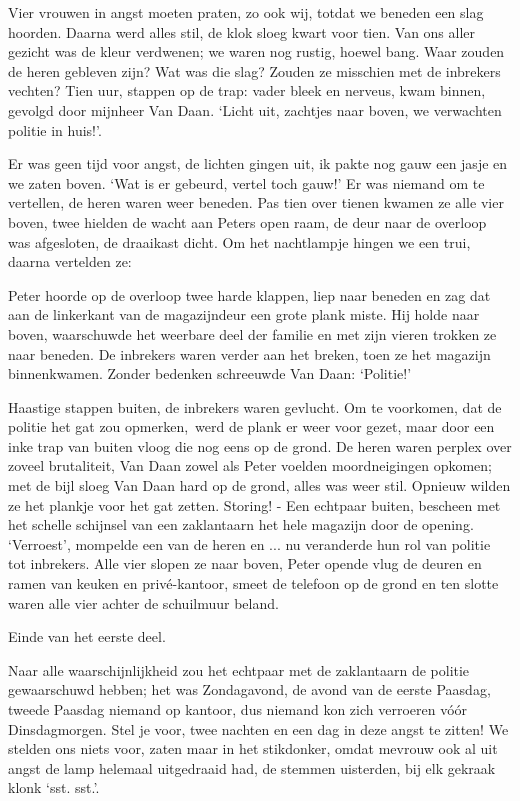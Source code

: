 \documentclass{book}
\begin{document}
Vier vrouwen in angst moeten praten, zo ook wij, totdat we beneden een
slag hoorden. Daarna werd alles stil, de klok sloeg kwart voor tien. Van
ons aller gezicht was de kleur verdwenen; we waren nog rustig, hoewel
bang. Waar zouden de heren gebleven zijn? Wat was die slag? Zouden ze
misschien met de inbrekers vechten? Tien uur, stappen op de trap: vader
bleek en nerveus, kwam binnen, gevolgd door mijnheer Van Daan. `Licht
uit, zachtjes naar boven, we verwachten politie in huis!'.

Er was geen tijd voor angst, de lichten gingen uit, ik pakte nog gauw
een jasje en we zaten boven. `Wat is er gebeurd, vertel toch gauw!' Er
was niemand om te vertellen, de heren waren weer beneden. Pas tien over
tienen kwamen ze alle vier boven, twee hielden de wacht aan Peters open
raam, de deur naar de overloop was afgesloten, de draaikast dicht. Om
het nachtlampje hingen we een trui, daarna vertelden ze:

Peter hoorde op de overloop twee harde klappen, liep naar beneden en zag
dat aan de linkerkant van de magazijndeur een grote plank miste. Hij
holde naar boven, waarschuwde het weerbare deel der familie en met zijn
vieren trokken ze naar beneden. De inbrekers waren verder aan het
breken, toen ze het magazijn binnenkwamen. Zonder bedenken schreeuwde
Van Daan: `Politie!'

Haastige stappen buiten, de inbrekers waren gevlucht. Om te voorkomen,
dat de politie het gat zou opmerken,~werd de plank er weer voor gezet,
maar door een inke trap van buiten vloog die nog eens op de grond. De
heren waren perplex over zoveel brutaliteit, Van Daan zowel als Peter
voelden moordneigingen opkomen; met de bijl sloeg Van Daan hard op de
grond, alles was weer stil. Opnieuw wilden ze het plankje voor het gat
zetten. Storing! - Een echtpaar buiten, bescheen met het schelle
schijnsel van een zaklantaarn het hele magazijn door de opening.
`Verroest', mompelde een van de heren en ... nu veranderde hun rol van
politie tot inbrekers. Alle vier slopen ze naar boven, Peter opende vlug
de deuren en ramen van keuken en privé-kantoor, smeet de telefoon op de
grond en ten slotte waren alle vier achter de schuilmuur beland.

Einde van het eerste deel.

Naar alle waarschijnlijkheid zou het echtpaar met de zaklantaarn de
politie gewaarschuwd hebben; het was Zondagavond, de avond van de eerste
Paasdag, tweede Paasdag niemand op kantoor, dus niemand kon zich
verroeren vóór Dinsdagmorgen. Stel je voor, twee nachten en een dag in
deze angst te zitten! We stelden ons niets voor, zaten maar in het
stikdonker, omdat mevrouw ook al uit angst de lamp helemaal uitgedraaid
had, de stemmen uisterden, bij elk gekraak klonk `sst. sst.'.
\end{document}
